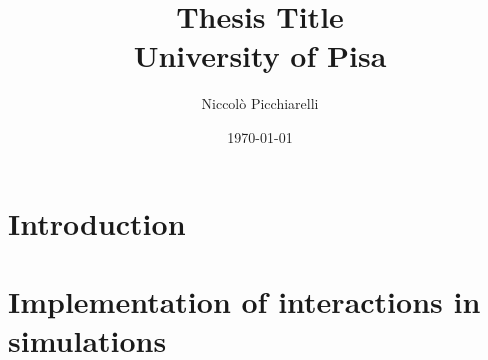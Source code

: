 \documentclass[a4paper]{book} %
\title{
	{Thesis Title}\\
	{\large University of Pisa}\\
}
\author{Niccolò Picchiarelli}
\date{\today}
\begin{document}
	
	\maketitle
	
	\chapter{Introduction}
	
	\chapter{Implementation of interactions in simulations}
	
	
	\begin{comment}
			\chapter{Implementation of interactions in simulations}
		\section{Previous Developments}
		\section{Steric Interactions}
		\subsection{All to All}
		\subsection{Range}s
		\section{Aligning Interactions}
		
		\chapter{Analysis of Structure and Dynamics}
		\section{Radial Distribution Function}
		
		\chapter{Inference of interaction potentials from data}
		\chapter{Conclusion}
	\end{comment}

	\printbibliography
\end{document}
